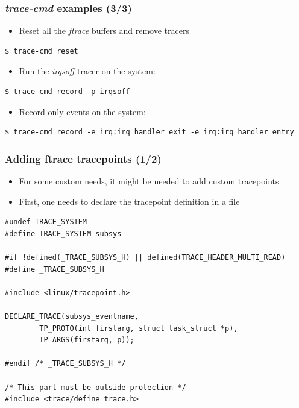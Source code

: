 \begin{frame}[fragile]
  \frametitle{{\em trace-cmd} examples (3/3)}
  \begin{itemize}
    \item Reset all the {\em ftrace} buffers and remove tracers
  \end{itemize}
  \begin{block}{}
    \begin{verbatim}
$ trace-cmd reset
    \end{verbatim}
  \end{block}

  \begin{itemize}
    \item Run the {\em irqsoff} tracer on the system:
  \end{itemize}
  \begin{block}{}
    \begin{verbatim}
$ trace-cmd record -p irqsoff
    \end{verbatim}
  \end{block}
  \begin{itemize}
    \item Record only  events on the
          system:
  \end{itemize}
  \begin{block}{}
    \begin{verbatim}
$ trace-cmd record -e irq:irq_handler_exit -e irq:irq_handler_entry
    \end{verbatim}
  \end{block}

\end{frame}

\begin{frame}[fragile]
  \frametitle{Adding ftrace tracepoints (1/2)}
  \begin{itemize}
    \item For some custom needs, it might be needed to add custom tracepoints
    \item First, one needs to declare the tracepoint definition in a 
          file
  \end{itemize}
  \begin{block}{}
    \begin{verbatim}
#undef TRACE_SYSTEM
#define TRACE_SYSTEM subsys

#if !defined(_TRACE_SUBSYS_H) || defined(TRACE_HEADER_MULTI_READ)
#define _TRACE_SUBSYS_H

#include <linux/tracepoint.h>

DECLARE_TRACE(subsys_eventname,
        TP_PROTO(int firstarg, struct task_struct *p),
        TP_ARGS(firstarg, p));

#endif /* _TRACE_SUBSYS_H */

/* This part must be outside protection */
#include <trace/define_trace.h>
    \end{verbatim}
  \end{block}
\end{frame}

